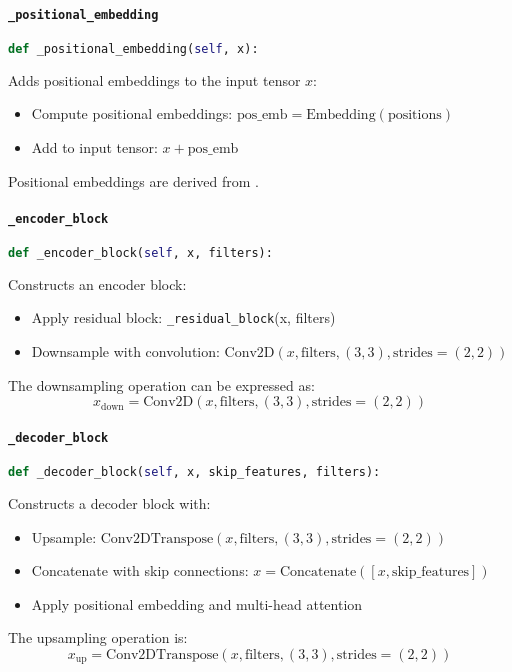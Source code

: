 \documentclass{article}
\begin{document}
	\paragraph{\texttt{\_positional\_embedding}}
	\begin{lstlisting}[language=Python]
		def _positional_embedding(self, x):
	\end{lstlisting}
	Adds positional embeddings to the input tensor \(x\):
	\begin{itemize}
		\item Compute positional embeddings: \(\text{pos\_emb} = \text{Embedding}(\text{positions})\)
		\item Add to input tensor: \(x + \text{pos\_emb}\)
	\end{itemize}
	Positional embeddings are derived from \cite{vaswani2017attention}.
	
	\paragraph{\texttt{\_encoder\_block}}
	\begin{lstlisting}[language=Python]
		def _encoder_block(self, x, filters):
	\end{lstlisting}
	Constructs an encoder block:
	\begin{itemize}
		\item Apply residual block: \texttt{\_residual\_block}(x, filters)
		\item Downsample with convolution: \( \text{Conv2D}(x, \text{filters}, (3, 3), \text{strides}=(2, 2)) \)
	\end{itemize}
	The downsampling operation can be expressed as:
	\[
	x_{\text{down}} = \text{Conv2D}(x, \text{filters}, (3, 3), \text{strides}=(2, 2))
	\]
	
	\paragraph{\texttt{\_decoder\_block}}
	\begin{lstlisting}[language=Python]
		def _decoder_block(self, x, skip_features, filters):
	\end{lstlisting}
	Constructs a decoder block with:
	\begin{itemize}
		\item Upsample: \( \text{Conv2DTranspose}(x, \text{filters}, (3, 3), \text{strides}=(2, 2)) \)
		\item Concatenate with skip connections: \( x = \text{Concatenate}([x, \text{skip\_features}]) \)
		\item Apply positional embedding and multi-head attention
	\end{itemize}
	The upsampling operation is:
	\[
	x_{\text{up}} = \text{Conv2DTranspose}(x, \text{filters}, (3, 3), \text{strides}=(2, 2))
	\]
	
\end{document}
